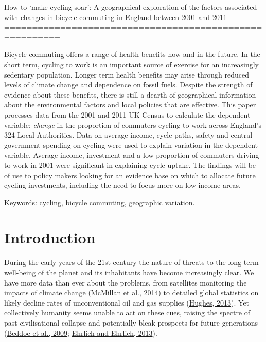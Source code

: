 How to `make cycling soar': A geographical exploration of the factors
associated with changes in bicycle commuting in England between 2001 and
2011 ========================================================

Bicycle commuting offers a range of health benefits now and in the
future. In the short term, cycling to work is an important source of
exercise for an increasingly sedentary population. Longer term health
benefits may arise through reduced levels of climate change and
dependence on fossil fuels. Despite the strength of evidence about these
benefits, there is still a dearth of geographical information about the
environmental factors and local policies that are effective. This paper
processes data from the 2001 and 2011 UK Census to calculate the
dependent variable: \emph{change} in the proportion of commuters cycling
to work across England's 324 Local Authorities. Data on average income,
cycle paths, safety and central government spending on cycling were used
to explain variation in the dependent variable. Average income,
investment and a low proportion of commuters driving to work in 2001
were significant in explaining cycle uptake. The findings will be of use
to policy makers looking for an evidence base on which to allocate
future cycling investments, including the need to focus more on
low-income areas.

Keywords: cycling, bicycle commuting, geographic variation.

\section{Introduction}\label{introduction}

During the early years of the 21st century the nature of threats to the
long-term well-being of the planet and its inhabitants have become
increasingly clear. We have more data than ever about the problems, from
satellites monitoring the impacts of climate change
(\href{http://onlinelibrary.wiley.com/doi/10.1002/2014GL060111/abstract}{McMillan
et al., 2014}) to detailed global statistics on likely decline rates of
unconventional oil and gas supplies
(\href{http://www.nature.com/nature/journal/v494/n7437/full/494307a.html}{Hughes,
2013}). Yet collectively humanity seems unable to act on these cues,
raising the spectre of past civilisational collapse and potentially
bleak prospects for future generations
(\href{http://www.pnas.org/content/106/8/2483.abstract}{Beddoe et al.,
2009};
\href{http://rspb.royalsocietypublishing.org/content/280/1754/20122845.full}{Ehrlich
and Ehrlich, 2013}).

